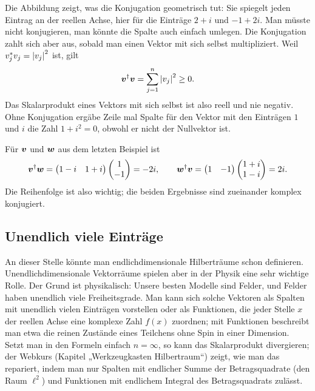Die Abbildung zeigt, was die Konjugation geometrisch tut: Sie spiegelt jeden Eintrag an der reellen Achse, hier für die Einträge $2+i$ und $-1+2i$. Man müsste nicht konjugieren, man könnte die Spalte auch einfach umlegen. Die Konjugation zahlt sich aber aus, sobald man einen Vektor mit sich selbst multipliziert. Weil $v_j^* v_j = \left\lvert v_j \right\rvert^2$ ist, gilt
\begin{equation}
	\boldsymbol{v}^{\dagger}\boldsymbol{v} = \sum_{j=1}^{n} \left\lvert v_j \right\rvert^2 \geq 0.
\end{equation}
Das Skalarprodukt eines Vektors mit sich selbst ist also reell und nie negativ. Ohne Konjugation ergäbe Zeile mal Spalte für den Vektor mit den Einträgen $1$ und $i$ die Zahl $1+i^2=0$, obwohl er nicht der Nullvektor ist.

\begin{beispiel}
	Für $\boldsymbol{v}$ und $\boldsymbol{w}$ aus dem letzten Beispiel ist
	\begin{equation}
		\boldsymbol{v}^{\dagger}\boldsymbol{w} = \begin{pmatrix} 1-i & 1+i \end{pmatrix} \begin{pmatrix} 1 \\ -1 \end{pmatrix} = -2i, \qquad
		\boldsymbol{w}^{\dagger}\boldsymbol{v} = \begin{pmatrix} 1 & -1 \end{pmatrix} \begin{pmatrix} 1+i \\ 1-i \end{pmatrix} = 2i.
	\end{equation}
	Die Reihenfolge ist also wichtig; die beiden Ergebnisse sind zueinander komplex konjugiert.
\end{beispiel}

\subsection{Unendlich viele Einträge}
An dieser Stelle könnte man endlichdimensionale Hilberträume schon definieren. Unendlichdimensionale Vektorräume spielen aber in der Physik eine sehr wichtige Rolle. Der Grund ist physikalisch: Unsere besten Modelle sind Felder, und Felder haben unendlich viele Freiheitsgrade. Man kann sich solche Vektoren als Spalten mit unendlich vielen Einträgen vorstellen oder als Funktionen, die jeder Stelle $x$ der reellen Achse eine komplexe Zahl $f(x)$ zuordnen; mit Funktionen beschreibt man etwa die reinen Zustände eines Teilchens ohne Spin in einer Dimension. Setzt man in den Formeln einfach $n=\infty$, so kann das Skalarprodukt divergieren; der Webkurs (Kapitel „Werkzeugkasten Hilbertraum“) zeigt, wie man das repariert, indem man nur Spalten mit endlicher Summe der Betragsquadrate (den Raum $\ell^2$) und Funktionen mit endlichem Integral des Betragsquadrats zulässt.

